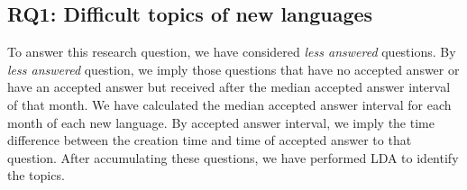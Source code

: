 \subsection{RQ1: Difficult topics of new languages}
\label{RQ1}

To answer this research question, we have considered \emph{less answered} questions. By \emph{less answered} question, we imply those questions that have no accepted answer or have an accepted answer but received after the median accepted answer interval of that month. We have calculated the median accepted answer interval for each month of each new language. By accepted answer interval, we imply the time difference between the creation time and time of accepted answer to that question. After accumulating these questions, we have performed LDA  to identify the topics.
 
